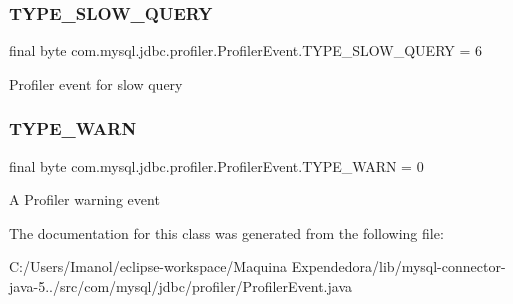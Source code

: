 \subsubsection{\texorpdfstring{T\+Y\+P\+E\+\_\+\+S\+L\+O\+W\+\_\+\+Q\+U\+E\+RY}{TYPE\_SLOW\_QUERY}}
{\footnotesize\ttfamily final byte com.\+mysql.\+jdbc.\+profiler.\+Profiler\+Event.\+T\+Y\+P\+E\+\_\+\+S\+L\+O\+W\+\_\+\+Q\+U\+E\+RY = 6\hspace{0.3cm}{\ttfamily [static]}}

Profiler event for slow query \mbox{\label{classcom_1_1mysql_1_1jdbc_1_1profiler_1_1_profiler_event_a09239ec47cc814e66d678151c649c362}} 
\subsubsection{\texorpdfstring{T\+Y\+P\+E\+\_\+\+W\+A\+RN}{TYPE\_WARN}}
{\footnotesize\ttfamily final byte com.\+mysql.\+jdbc.\+profiler.\+Profiler\+Event.\+T\+Y\+P\+E\+\_\+\+W\+A\+RN = 0\hspace{0.3cm}{\ttfamily [static]}}

A Profiler warning event 

The documentation for this class was generated from the following file\+:\begin{DoxyCompactItemize}
\item 
C\+:/\+Users/\+Imanol/eclipse-\/workspace/\+Maquina Expendedora/lib/mysql-\/connector-\/java-\/5../src/com/mysql/jdbc/profiler/Profiler\+Event.\+java\end{DoxyCompactItemize}
